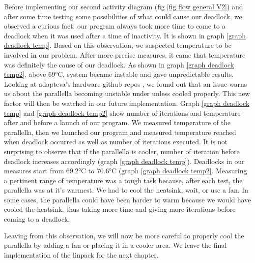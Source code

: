 Before implementing our second activity diagram (fig \ref{fig flow general V2}) and after some time testing some possibilities of what could cause our deadlock, we observed a curious fact: our program always took more time to come to a deadlock when it was used after a time of inactivity. It is shown in graph \ref{graph deadlock temp}. Based on this observation, we suspected temperature to be involved in our problem. After more precise measures, it came that temperature was definitely the cause of our deadlock. As shown in graph \ref{graph deadlock temp2}, above 69°C, system became instable and gave unpredictable results. Looking at adapteva's hardware github repos \cite{githubadaptevahard}, we found out that an issue warns us about the parallella becoming unstable under unless cooled properly\cite{githubadaptevahardissue}. This new factor will then be watched in our future implementation. Graph \ref{graph deadlock temp} and \ref{graph deadlock temp2} show number of iterations and temperature after and before a launch of our program. We measured temperature of the parallella, then we launched our program and measured temperature reached when deadlock occurred as well as number of iterations executed. It is not surprising to observe that if the parallella is cooler, number of iteration before deadlock increases accordingly (graph \ref{graph deadlock temp}). Deadlocks in our measures start from 69.2°C to 70.6°C (graph \ref{graph deadlock temp2}. Measuring a pertinent range of temperature was a tough task because, after each test, the parallella was at it's warmest. We had to cool the heatsink, wait, or use a fan. In some cases, the parallella could have been harder to warm because we would have cooled the heatsink, thus taking more time and giving more iterations before coming to a deadlock.

Leaving from this observation, we will now be more careful to properly cool the parallella by adding a fan or placing it in a cooler area. We leave the final implementation of the linpack for the next chapter.

%
%	
%	


